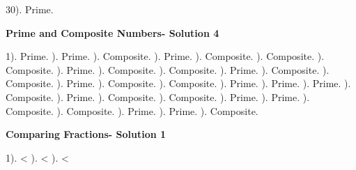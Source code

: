 \documentclass{article}%
\begin{document}
30). Prime.%
\newline%
\newpage%
\large%
\begin{center}%
\textbf{Prime and Composite Numbers- Solution 4}%
\newline%
\end{center} \normalsize%
1). Prime.%
). Prime.%
). Composite.%
). Prime.%
). Composite.%
). Composite.%
). Composite.%
). Prime.%
). Composite.%
). Composite.%
). Prime.%
). Composite.%
). Composite.%
). Prime.%
). Composite.%
). Composite.%
). Prime.%
). Prime.%
). Prime.%
). Composite.%
). Prime.%
). Composite.%
). Composite.%
). Prime.%
). Prime.%
). Composite.%
). Composite.%
). Prime.%
). Prime.%
). Composite.%
\newline%
\newpage%
\large%
\begin{center}%
\textbf{Comparing Fractions- Solution 1}%
\newline%
\end{center} \normalsize%
1). <%
). <%
). <%
\end{document}
